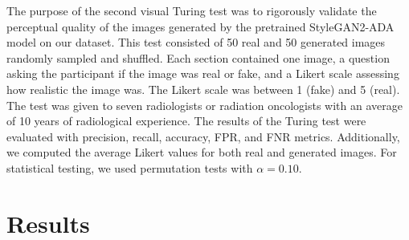 \documentclass[runningheads]{llncs}
\begin{document}
The purpose of the second visual Turing test was to rigorously validate the perceptual quality of the images generated by the pretrained StyleGAN2-ADA model on our dataset.
This test consisted of 50 real and 50 generated images randomly sampled and shuffled.
Each section contained one image, a question asking the participant if the image was real or fake, and a Likert scale assessing how realistic the image was.
The Likert scale was between 1 (fake) and 5 (real).
The test was given to seven radiologists or radiation oncologists with an average of 10 years of radiological experience.
The results of the Turing test were evaluated with precision, recall, accuracy, FPR, and FNR metrics.
Additionally, we computed the average Likert values for both real and generated images.
For statistical testing, we used permutation tests with $\alpha=0.10$.

\section{Results}
\end{document}
